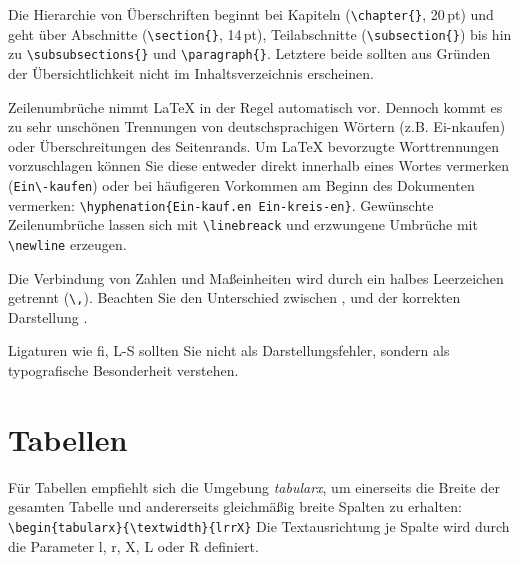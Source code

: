 \documentclass[twoside,bibliography=totoc,openany]{fumi}
\begin{document}
Die Hierarchie von Überschriften beginnt bei Kapiteln (\verb|\chapter{}|, 20\,pt) und geht über Abschnitte (\verb|\section{}|, 14\,pt), Teilabschnitte (\verb|\subsection{}|) bis hin zu \verb|\subsubsections{}| und \verb|\paragraph{}|. Letztere beide sollten aus Gründen der Übersichtlichkeit nicht im Inhaltsverzeichnis erscheinen.

Zeilenumbrüche nimmt LaTeX in der Regel automatisch vor. Dennoch kommt es zu sehr unschönen Trennungen von deutschsprachigen Wörtern (z.B. Ei-nkaufen) oder Überschreitungen des Seitenrands. Um LaTeX bevorzugte Worttrennungen vorzuschlagen können Sie diese entweder direkt innerhalb eines Wortes vermerken (\verb|Ein\-kaufen|) oder bei häufigeren Vorkommen am Beginn des Dokumenten vermerken: \verb|\hyphenation{Ein-kauf.en Ein-kreis-en}|. Gewünschte Zeilenumbrüche lassen sich mit \verb|\linebreack| und erzwungene Umbrüche mit \verb|\newline| erzeugen. 

Die Verbindung von Zahlen und Maßeinheiten wird durch ein halbes Leerzeichen getrennt (\verb|\,|). Beachten Sie den Unterschied zwischen ,  und der korrekten Darstellung .

Ligaturen wie fi, L-S sollten Sie nicht als Darstellungsfehler, sondern als typografische Besonderheit verstehen.

\section{Tabellen}
Für Tabellen empfiehlt sich die Umgebung \textit{tabularx}, um einerseits die Breite der gesamten Tabelle und andererseits gleichmäßig breite Spalten zu erhalten: \verb|\begin{tabularx}{\textwidth}{lrrX}|
Die Textausrichtung je Spalte wird durch die Parameter l, r, X, L oder R definiert.
\end{document}
